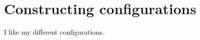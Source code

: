 \chapter{Constructing configurations} \label{ch:configuration}
I like my different configurations.




